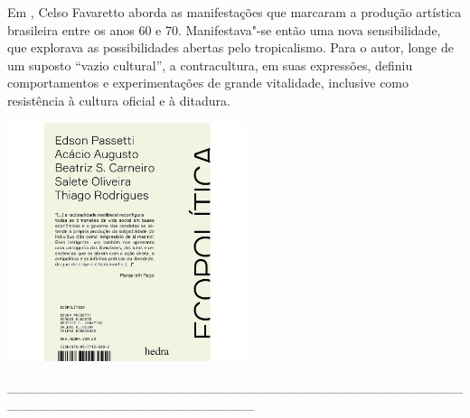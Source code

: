 {\noindent{}Em {}, Celso Favaretto aborda as manifestações que marcaram a produção artística brasileira entre os anos 60 e 70. Manifestava"-se então uma nova sensibilidade, que explorava as possibilidades abertas pelo tropicalismo. Para o autor, longe de um suposto “vazio cultural”, a contracultura, em suas expressões, definiu comportamentos e experimentações de grande vitalidade, inclusive como resistência à cultura oficial e à ditadura.

\hspace{.5cm}

\hspace*{-.4cm}\begin{minipage}[c]{1\linewidth}
\small{
{}}
\end{minipage}

\pagebreak

\hspace{.5cm}

\begin{center}
\hspace*{-1cm}
\hspace{1cm}\includegraphics[width=70mm]{eco.jpeg}
\end{center}

\hspace*{-2cm}\_\_\_\_\_\_\_\_\_\_\_\_\_\_\_\_\_\_\_\_\_\_\_\_\_\_\_\_\_\_\_\_\_\_\_\_\_\_\_\_\_\_\_\_\_\_\_\_\_\_\_\_\_\_\_\_\_\_\_\_\_\_\_\_\_\_\_\_\_\_\_\_\_\_

}
